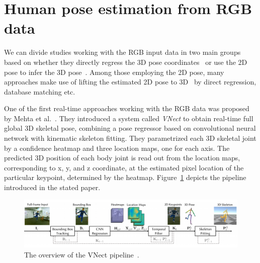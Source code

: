 \section{Human pose estimation from RGB data}
We can divide studies working with the RGB input data in two main groups based on whether they directly regress the 3D pose coordinates~\cite{DBLP:journals/corr/MartinezHRL17,DBLP:journals/corr/0001SLW17} or use the 2D pose to infer the 3D pose~\cite{DBLP:journals/corr/ChenR16a,mono-3dhp2017,singleshotmultiperson2018,VNect_SIGGRAPH2017,lcrnet}. Among those employing the 2D pose, many approaches make use of lifting the estimated 2D pose to 3D~\cite{DBLP:journals/corr/ChenR16a,DBLP:journals/corr/IqbalDYK0G17,DBLP:journals/corr/MartinezHRL17,DBLP:journals/corr/Moreno-Noguer16} by direct regression, database matching etc. \par
\vspace{5mm}
\noindent One of the first real-time approaches working with the RGB data was proposed by Mehta et al.~\cite{VNect_SIGGRAPH2017}. They introduced a system called \textit{VNect} to obtain real-time full global 3D skeletal pose, combining a pose regressor based on convolutional neural network with kinematic skeleton fitting. They parametrized each 3D skeletal joint by a confidence heatmap and three location maps, one for each axis. The predicted 3D position of each body joint is read out from the location maps, corresponding to x, y, and z coordinate, at the estimated pixel location of the particular keypoint, determined by the heatmap. Figure~\ref{fig:Vnect} depicts the pipeline introduced in the stated paper.\par

\vspace{5mm}
\begin{figure}[H]
\begin{center}
  \includegraphics[width=\textwidth]{images/related_work/VNect.PNG}
  \caption{The overview of the VNect pipeline~\cite{VNect_SIGGRAPH2017}.}
  \label{fig:Vnect}
\end{center}
\end{figure}

